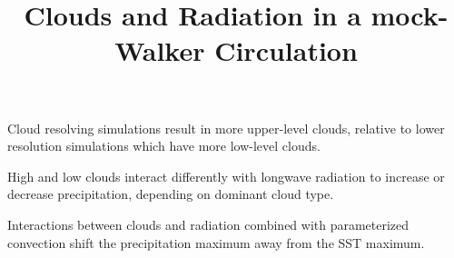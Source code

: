 \documentclass[draft]{agujournal2019}
\begin{document}
\title{Clouds and Radiation in a mock-Walker Circulation}



\begin{keypoints}
  \item{Cloud resolving simulations result in more upper-level clouds, relative to lower resolution simulations which have more low-level clouds.}
  \item{High and low clouds interact differently with longwave radiation to increase or decrease precipitation, depending on dominant cloud type.}
  \item{Interactions between clouds and radiation combined with parameterized convection shift the precipitation maximum away from the SST maximum.}
\end{keypoints}
\end{document}
